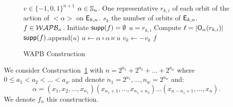 \documentclass{llncs}
\begin{document}
\begin{figure}[H]

		\begin{algorithmic}[1]			
			\Require $v\in \{-1,0,1\}^{n+1}$ %
		\Require $\alpha \in \mathbb{S}_n$. One representative $r_{k,i}$ of each orbit of the action of $<\alpha>$ on $\mathsf{E}_{k,n}$. $s_k$ the number of orbits of $\mathsf{E}_{k,n}$.
\Ensure  $f\in \mathcal{WAPB}_{n}$.
\State Initiate $\mathsf{supp}(f)=\emptyset$ \;
\State $u=r_{k,i}$ \;
\State Compute $\ell=|\mathsf{O}_{\alpha}(r_{k,i})|$ \;
\State  $\mathsf{supp}(f)$.append($u$)\;
\State  $u \gets \alpha \circ \alpha \ltimes u$\;
\State $v_k\gets -v_k$ \;
\EndFor
\EndFor		
\EndFor	
			\State  \Return $f$
		\end{algorithmic}
\caption{WAPB Construction~\label{Alg:WAPBconst}}
\end{figure}


We consider Construction~\ref{Alg:WAPBconst} with $n=2^{a_1}+2^{a_2}+\ldots +2^{a_w}$ where $0\le a_1<a_2<\ldots <a_w$ and denote $n_1=2^{a_1},\ldots, n_w=2^{a_w}$ and:
\[\alpha=(x_1,x_2,\ldots,x_{n_1}) (x_{n_1+1},\ldots,x_{n_1+n_2})\ldots  (x_{n-n_1+1},\ldots,x_n).\] 
We denote $f_n$ this construction.
\end{document}
